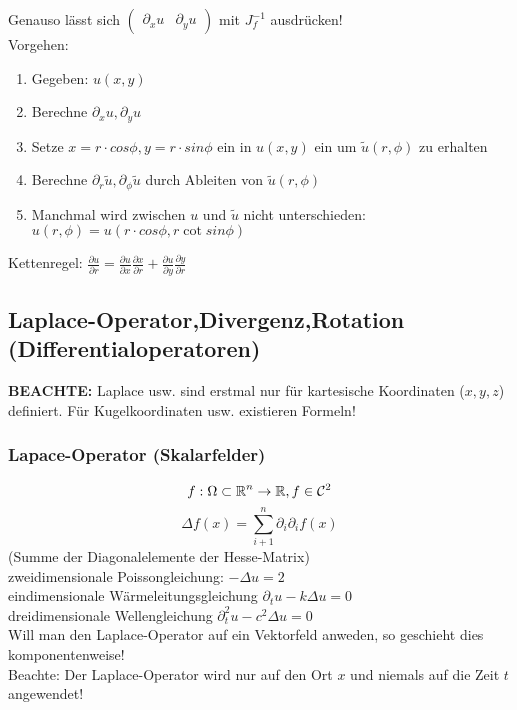 \documentclass[german]{latex4ei/latex4ei_sheet}
\begin{document}
Genauso l\"asst sich $\begin{pmatrix}
\partial_x u & \partial_y u
\end{pmatrix}$ mit $J_f^{-1}$ ausdr\"ucken!\\
Vorgehen:
\begin{enumerate}
\item Gegeben: $u(x,y)$
\item Berechne $\partial_x u, \partial_y u$
\item Setze $x=r \cdot cos \phi, y=r \cdot sin \phi$ ein in $u(x,y)$ ein um $\tilde{u}(r,\phi)$ zu erhalten
\item Berechne $\partial_r \tilde{u}, \partial_\phi \tilde{u}$ durch Ableiten von $\tilde{u}(r,\phi)$
\item Manchmal wird zwischen $u$ und $\tilde{u}$ nicht unterschieden: $u(r,\phi)=u(r \cdot cos \phi,r \cot sin \phi)$
\end{enumerate}
Kettenregel: $\frac{\partial u}{\partial r} = \frac{\partial u}{\partial x}\frac{\partial x}{\partial r} + \frac{\partial u}{\partial y}\frac{\partial y}{\partial r} $



\subsection{Laplace-Operator,Divergenz,Rotation (Differentialoperatoren)}
\textbf{BEACHTE:} Laplace usw. sind erstmal nur f\"ur kartesische Koordinaten ($x,y,z$) definiert. F\"ur Kugelkoordinaten usw. existieren Formeln!\\

\subsubsection{Lapace-Operator (Skalarfelder)}
\[f: \Omega \subset \operatorname{\mathbb R}^n \rightarrow \operatorname{\mathbb R}, f \in \mathcal{C}^2\]
\[\Delta f(x)=\sum_{i+1}^{n} \partial_i \partial_i f(x)\] (Summe der Diagonalelemente der Hesse-Matrix) \\
zweidimensionale Poissongleichung: $−\Delta u = 2$\\
eindimensionale W\"armeleitungsgleichung $\partial_t u - k\Delta u = 0$\\
dreidimensionale Wellengleichung $\partial_t^2 u − c^2\Delta u = 0$\\
Will man den Laplace-Operator auf ein Vektorfeld anweden, so geschieht dies komponentenweise!\\ 
Beachte: Der Laplace-Operator wird nur auf den Ort $x$ und niemals auf die Zeit $t$ angewendet!
\end{document}
